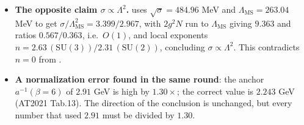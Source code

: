 \begin{itemize}
\item \textbf{The opposite claim $\sigma\propto\Lambda^{2}$.}  uses
      $\sqrt{\sigma}=484.96$ MeV and $\Lambda_{\mathrm{MS}}=263.04$ MeV to get
      $\sigma/\Lambda^{2}_{\mathrm{MS}}=3.399/2.967$, with $2g^{2}N$ run to $\Lambda_{\mathrm{MS}}$
      giving $9.363$ and ratios $0.567/0.363$, i.e.\ $O(1)$, and local exponents
      $n=2.63\,(\mathrm{SU}(3))/2.31\,(\mathrm{SU}(2))$, concluding $\sigma\propto\Lambda^{2}$. This
      contradicts $n=0$ from . \LM
\item \textbf{A normalization error found in the same round}: the anchor $a^{-1}(\beta=6)$ of $2.91$
      GeV is high by $1.30\times$; the correct value is $2.243$ GeV (AT2021 Tab.13). The direction of
      the conclusion is unchanged, but every number that used $2.91$ must be divided by $1.30$. \LE
\end{itemize}
